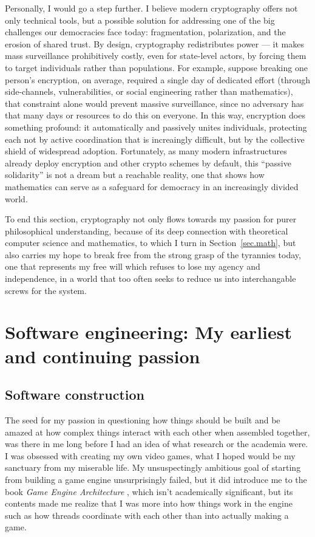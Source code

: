 \documentclass{article}
\begin{document}
Personally, I would go a step further. I believe modern cryptography offers not
only technical tools, but a possible solution for addressing one of the big
challenges our democracies face today: fragmentation, polarization, and the
erosion of shared trust. By design, cryptography redistributes power --- it
makes mass surveillance prohibitively costly, even for state-level actors, by
forcing them to target individuals rather than populations. For example,
suppose breaking one person’s encryption, on average, required a single day of
dedicated effort (through side-channels, vulnerabilities, or social engineering
rather than mathematics), that constraint alone would prevent massive
surveillance, since no adversary has that many days or resources to do this on
everyone. In this way, encryption does something profound: it automatically and
passively unites individuals, protecting each not by active coordination that
is increaingly difficult, but by the collective shield of widespread adoption.
Fortunately, as many modern infrastructures already deploy encryption and other
crypto schemes by default, this ``passive solidarity'' is not a dream but a
reachable reality, one that shows how mathematics can serve as a safeguard for
democracy in an increasingly divided world.

To end this section, cryptography not only flows towards my passion for purer
philosophical understanding, because of its deep connection with theoretical
computer science and mathematics, to which I turn in Section~\ref{sec.math},
but also carries my hope to break free from the strong grasp of the tyrannies
today, one that represents my free will which refuses to lose my agency and
independence, in a world that too often seeks to reduce us into interchangable
screws for the system.  

\section{Software engineering: My earliest and continuing passion}
\subsection{Software construction}
The seed for my passion in questioning how things should be built and be amazed
at how complex things interact with each other when assembled together, was
there in me long before I had an idea of what research or the academia were. I
was obsessed with creating my own video games, what I hoped would be my
sanctuary from my miserable life. My unsuspectingly ambitious goal of starting
from building a game engine unsurprisingly failed, but it did introduce me to
the book \emph{Game Engine Architecture} \cite{game.engine.arch}, which isn't
academically significant, but its contents made me realize that I was more into
how things work in the engine such as how threads coordinate with each other
than into actually making a game.
\end{document}
